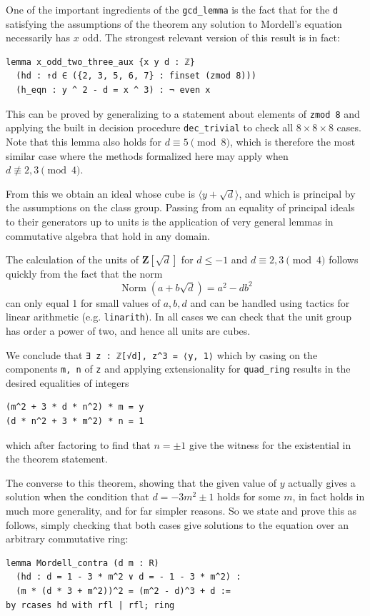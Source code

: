 \documentclass[sigplan,10pt,nonacm,
screen]{acmart} \settopmatter{printfolios=true,printccs=false,printacmref=false}
\newcommand{\ZZ}{\mathbf{Z}}
\DeclareMathOperator{\Norm}{Norm}
\begin{document}
One of the important ingredients of the \lstinline{gcd_lemma} is the fact that for the \lstinline{d} satisfying the assumptions of the theorem any solution to Mordell's equation necessarily has $x$ odd.
The strongest relevant version of this result is in fact:
\begin{lstlisting}
lemma x_odd_two_three_aux {x y d : ℤ}
  (hd : ↑d ∈ ({2, 3, 5, 6, 7} : finset (zmod 8)))
  (h_eqn : y ^ 2 - d = x ^ 3) : ¬ even x
\end{lstlisting}
This can be proved by generalizing to a statement about elements of \lstinline{zmod 8} and applying the built in decision procedure \lstinline{dec_trivial} to check all $8 \times 8 \times 8$ cases.
Note that this lemma also holds for $d \equiv 5 \pmod 8$, which is therefore the most similar case where the methods formalized here may apply when $d \not\equiv 2,3\pmod 4$.

From this we obtain an ideal whose cube is $\langle y + \sqrt{d} \rangle$, and which is principal by the assumptions on the class group.
Passing from an equality of principal ideals to their generators up to units is the application of very general lemmas in commutative algebra that hold in any domain.

The calculation of the units of $\ZZ[\sqrt d]$ for $d \le -1$ and $d\equiv 2,3\pmod 4$ follows quickly from the fact that the norm
$$\Norm(a+b \sqrt d) = a^2 - d b^2$$
can only equal 1 for small values of $a,b,d$ and can be handled using tactics for linear arithmetic (e.g. \lstinline{linarith}).
In all cases we can check that the unit group has order a power of two, and hence all units are cubes.

We conclude that
\lstinline{∃ z : ℤ[√d], z^3 = ⟨y, 1⟩}
which by casing on the components \lstinline{m, n} of \lstinline{z} and applying extensionality for \lstinline{quad_ring} results in the desired equalities of integers
\begin{lstlisting}
(m^2 + 3 * d * n^2) * m = y
(d * n^2 + 3 * m^2) * n = 1
\end{lstlisting}
which after factoring to find that $n = \pm 1$ give the witness for the existential in the theorem statement.

The converse to this theorem, showing that the given value of $y$ actually gives a solution when the condition that $d = -3m^2 \pm 1$ holds for some $m$, in fact holds in much more generality, and for far simpler reasons.
So we state and prove this as follows, simply checking that both cases give solutions to the equation over an arbitrary commutative ring:
\begin{lstlisting}
lemma Mordell_contra (d m : R)
  (hd : d = 1 - 3 * m^2 ∨ d = - 1 - 3 * m^2) :
  (m * (d * 3 + m^2))^2 = (m^2 - d)^3 + d :=
by rcases hd with rfl | rfl; ring
\end{lstlisting}
\end{document}
